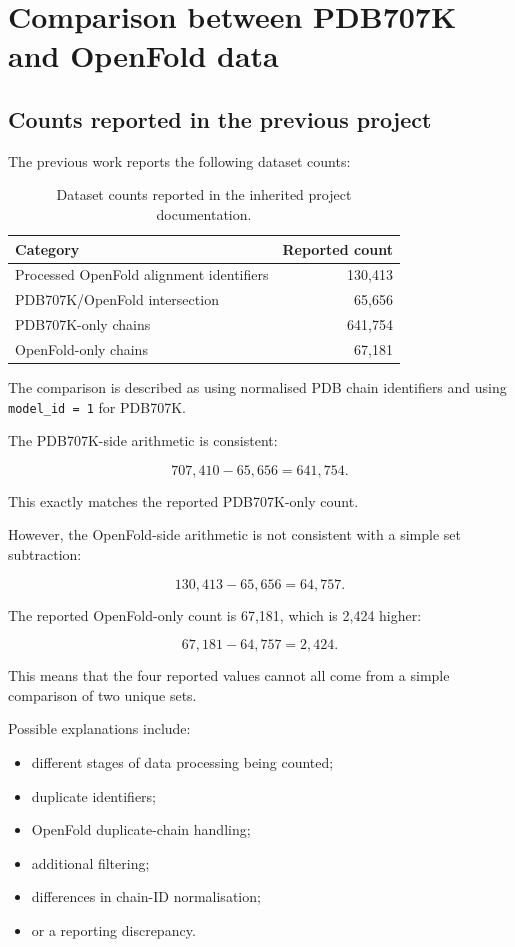 \documentclass[11pt,a4paper]{article}
\begin{document}
\section{Comparison between PDB707K and OpenFold data}

\subsection{Counts reported in the previous project}

The previous work reports the following dataset counts:

\begin{table}[h]
\centering
\begin{tabular}{lr}
\toprule
\textbf{Category} & \textbf{Reported count} \\
\midrule
Processed OpenFold alignment identifiers & 130,413 \\
PDB707K/OpenFold intersection & 65,656 \\
PDB707K-only chains & 641,754 \\
OpenFold-only chains & 67,181 \\
\bottomrule
\end{tabular}
\caption{Dataset counts reported in the inherited project documentation.}
\end{table}

The comparison is described as using normalised PDB chain identifiers and using \texttt{model\_id = 1} for PDB707K.

The PDB707K-side arithmetic is consistent:

\[
707{,}410 - 65{,}656 = 641{,}754.
\]

This exactly matches the reported PDB707K-only count.

However, the OpenFold-side arithmetic is not consistent with a simple set subtraction:

\[
130{,}413 - 65{,}656 = 64{,}757.
\]

The reported OpenFold-only count is 67,181, which is 2,424 higher:

\[
67{,}181 - 64{,}757 = 2{,}424.
\]

This means that the four reported values cannot all come from a simple comparison of two unique sets.

Possible explanations include:

\begin{itemize}[leftmargin=*]

    \item different stages of data processing being counted;

    \item duplicate identifiers;

    \item OpenFold duplicate-chain handling;

    \item additional filtering;

    \item differences in chain-ID normalisation;

    \item or a reporting discrepancy.

\end{itemize}
\end{document}
